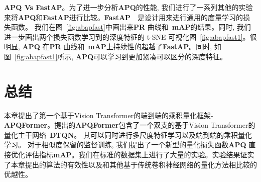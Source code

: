 \textbf{APQ Vs FastAP}。为了进一步分析\textbf{APQ}的性能, 我们进行了一系列其他的实验来将\textbf{APQ}和\textbf{FastAP}进行比较。\textbf{FastAP}~~\cite{cakir2019deep}是设计用来进行通用的度量学习的损失函数。 我们在图~\ref{fig:abapfast}中画出来\textbf{PR} 曲线和~\textbf{mAP}的结果。同时, 我们进一步画出两个损失函数学习到的深度特征的 t-SNE 可视化图~\ref{fig:abapfast1}。很明显, \textbf{APQ} 在\textbf{PR} 曲线和~\textbf{mAP}上持续性的超越了\textbf{FastAP}。同时, 如图~\ref{fig:abapfast1}所示, \textbf{APQ}可以学习到更加紧凑可以区分的深度特征。 
\section{总结}
本章提出了第一个基于Vision Transformer的端到端的乘积量化框架-\textbf{APQFormer}。提出的\textbf{APQFormer}包含了一个双支的基于Vision Transformer的量化主干网络~\textbf{DTQN}。 其可以同时进行多尺度特征学习以及端到端的乘积量化学习。 对于相似度保留的监督训练, 我们提出了一个新型的量化损失函数\textbf{APQ} 直接优化评估指标\textbf{mAP}。我们在标准的数据集上进行了大量的实验。实验结果证实了本章提出的算法的有效性以及和其他基于传统卷积神经网络的量化方法相比较的优越性。